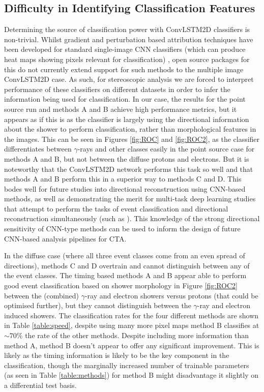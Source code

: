 \subsection{Difficulty in Identifying Classification Features}
Determining the source of classification power with ConvLSTM2D classifiers is non-trivial. Whilst gradient and perturbation based attribution techniques have been developed for standard single-image CNN classifiers (which can produce heat maps showing pixels relevant for classification) \cite{deepexplain}, open source packages for this do not currently extend support for such methods to the multiple image ConvLSTM2D case. As such, for stereoscopic analysis we are forced to interpret performance of these classifiers on different datasets in order to infer the information being used for classification. In our case, the results for the point source run and methods A and B achieve high performance metrics, but it appears as if this is as the classifier is largely using the directional information about the shower to perform classification, rather than morphological features in the images. This can be seen in Figures \ref{fig:ROC} and \ref{fig:ROC2}, as the classifier differentiates between $\gamma$-rays and other classes easily in the point source case for methods A and B, but not between the diffuse protons and electrons. But it is noteworthy that the ConvLSTM2D network performs this task so well and that methods A and B perform this in a superior way to methods C and D. This bodes well for future studies into directional reconstruction using CNN-based methods, as well as demonstrating the merit for multi-task deep learning studies that attempt to perform the tasks of event classification and directional reconstruction simultaneously (such as \cite{jacquemont}). This knowledge of the strong directional sensitivity of CNN-type methods can be used to inform the design of future CNN-based analysis pipelines for CTA.

In the diffuse case (where all three event classes come from an even spread of directions), methods C and D overtrain and cannot distinguish between any of the event classes. The timing based methods A and B appear able to perform good event classification based on shower morphology in Figure \ref{fig:ROC2} between the (combined) $\gamma$-ray and electron showers versus protons (that could be optimised further), but they cannot distinguish between the $\gamma$-ray and electron induced showers. The classification rates for the four different methods are shown in Table \ref{table:speed}, despite using many more pixel maps method B classifies at $\sim 70\%$ the rate of the other methods. Despite including more information than method A, method B doesn't appear to offer any significant improvement. This is likely as the timing information is likely to be the key component in the classification, though the marginally increased number of trainable parameters (as seen in Table \ref{table:methods}) for method B might disadvantage it slightly on a differential test basis.

